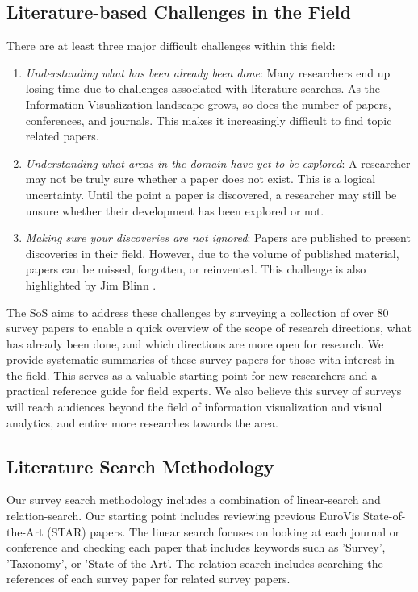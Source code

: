 \subsection{Literature-based Challenges in the Field}
There are at least three major difficult challenges within this field:
\begin{enumerate}
\item \textit{Understanding what has been already been done}: Many researchers end up losing time due to challenges associated with literature searches. As the Information Visualization landscape grows, so does the number of papers, conferences, and journals. This makes it increasingly difficult to find topic related papers. 
\item \textit{Understanding what areas in the domain have yet to be explored}: A researcher may not be truly sure whether a paper does not exist. This is a logical uncertainty. Until the point a paper is discovered, a researcher may still be unsure whether their development has been explored or not.
\item \textit{Making sure your discoveries are not ignored}: Papers are published to present discoveries in their field. However, due to the volume of published material, papers can be missed, forgotten, or reinvented. This challenge is also highlighted by Jim Blinn \cite{blinn1998ten}.
\end{enumerate}

The SoS aims to address these challenges by surveying a collection of over 80 survey papers to enable a quick overview of the scope of research directions, what has already been done, and which directions are more open for research. We provide systematic summaries of these survey papers for those with interest in the field. This serves as a valuable starting point for new researchers and a practical reference guide for field experts. We also believe this survey of surveys will reach audiences beyond the field of information visualization and visual analytics, and entice more researches towards the area.

\subsection{Literature Search Methodology}
Our survey search methodology includes a combination of linear-search and relation-search. Our starting point includes reviewing previous EuroVis State-of-the-Art (STAR) papers. The linear search focuses on looking at each journal or conference and checking each paper that includes keywords such as 'Survey', 'Taxonomy', or 'State-of-the-Art'. The relation-search includes searching the references of each survey paper for related survey papers. 

